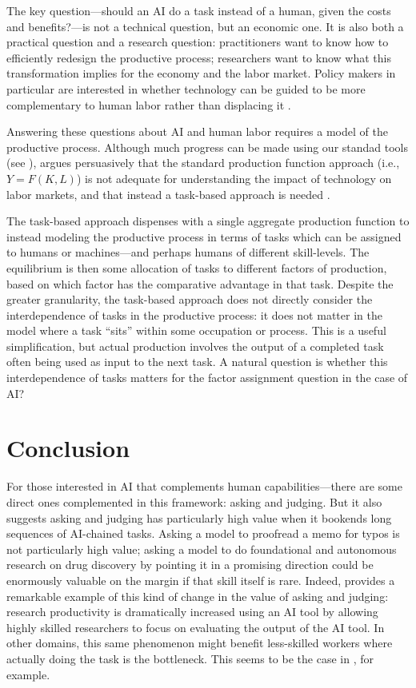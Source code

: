 \documentclass{article}
\theoremstyle{plain}
\theoremstyle{plain}
\begin{document}
The key question---should an AI do a task instead of a human, given the costs and benefits?---is not a technical question, but an economic one.
It is also both a practical question and a research question: practitioners want to know how to efficiently redesign the productive process; researchers want to know what this transformation implies for the economy and the labor market.
Policy makers in particular are interested in whether technology can be guided to be more complementary to human labor rather than displacing it \citep{acemoglu2018automation}.

Answering these questions about AI and human labor requires a model of the productive process.
Although much progress can be made using our standad tools (see \citep{korinek2018artificial}), \cite{acemoglu2024task} argues persuasively that the standard production function approach (i.e., $Y = F(K, L)$) is not adequate for understanding the impact of technology on labor markets, and that instead a task-based approach is needed \citep{aghion2024ai}.

The task-based approach dispenses with a single aggregate production function to instead modeling the productive process in terms of tasks which can be assigned to humans or machines---and perhaps humans of different skill-levels.
The equilibrium is then some allocation of tasks to different factors of production, based on which factor has the comparative advantage in that task.
Despite the greater granularity, the task-based approach does not directly consider the interdependence of tasks in the productive process: it does not matter in the model where a task ``sits'' within some occupation or process. 
This is a useful simplification, but actual production involves the output of a completed task often being used as input to the next task.
A natural question is whether this interdependence of tasks matters for the factor assignment question in the case of AI? 


\section{Conclusion}

For those interested in AI that complements human capabilities---there are some direct ones complemented in this framework: asking and judging.
But it also suggests asking and judging has particularly high value when it bookends long sequences of AI-chained tasks.
Asking a model to proofread a memo for typos is not particularly high value;
asking a model to do foundational and autonomous research on drug discovery by pointing it in a promising direction could be enormously valuable on the margin if that skill itself is rare.
Indeed, \cite{toner2024artificial} provides a remarkable example of this kind of change in the value of asking and judging:
research productivity is dramatically increased using an AI tool by allowing highly skilled researchers to focus on evaluating the output of the AI tool.
In other domains, this same phenomenon might benefit less-skilled workers where actually doing the task is the bottleneck.
This seems to be the case in \cite{brynjolfsson2023generative}, for example.
  
\end{document}
